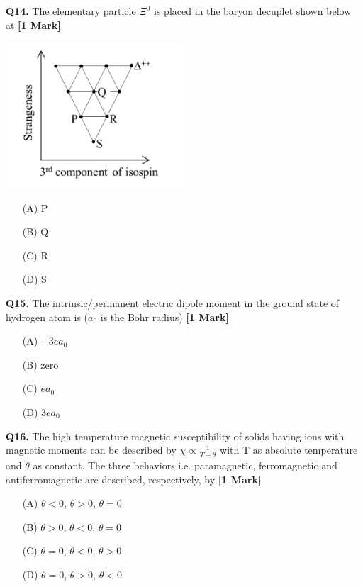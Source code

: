 \documentclass[11pt]{article}
\newcommand{\questiona}[2]{
    \noindent\textbf{Q#2.} #1 \hfill \textbf{[1 Mark]}
}
\begin{document}
\questiona{The elementary particle \(\Xi^0\) is placed in the baryon decuplet shown below at}{14}
\begin{center}
\includegraphics[width=0.5\textwidth]{figures/14.png}
\end{center}
\begin{enumerate}
    \item[(A)] P  
    \item[(B)] Q  
    \item[(C)] R  
    \item[(D)] S  
\end{enumerate}
\vspace{0.5cm}

\questiona{The intrinsic/permanent electric dipole moment in the ground state of hydrogen atom is (\(a_0\) is the Bohr radius)}{15}
\begin{enumerate}
    \item[(A)] \(-3ea_0\)  
    \item[(B)] zero  
    \item[(C)] \(ea_0\)  
    \item[(D)] \(3ea_0\)  
\end{enumerate}
\vspace{0.5cm}

\questiona{The high temperature magnetic susceptibility of solids having ions with magnetic moments can be described by \(\chi \propto \frac{1}{T + \theta}\) with T as absolute temperature and \(\theta\) as constant. The three behaviors i.e. paramagnetic, ferromagnetic and antiferromagnetic are described, respectively, by}{16}
\begin{enumerate}
    \item[(A)] \(\theta < 0\), \(\theta > 0\), \(\theta = 0\)  
    \item[(B)] \(\theta > 0\), \(\theta < 0\), \(\theta = 0\)  
    \item[(C)] \(\theta = 0\), \(\theta < 0\), \(\theta > 0\)  
    \item[(D)] \(\theta = 0\), \(\theta > 0\), \(\theta < 0\)  
\end{enumerate}
\vspace{0.5cm}
\end{document}
